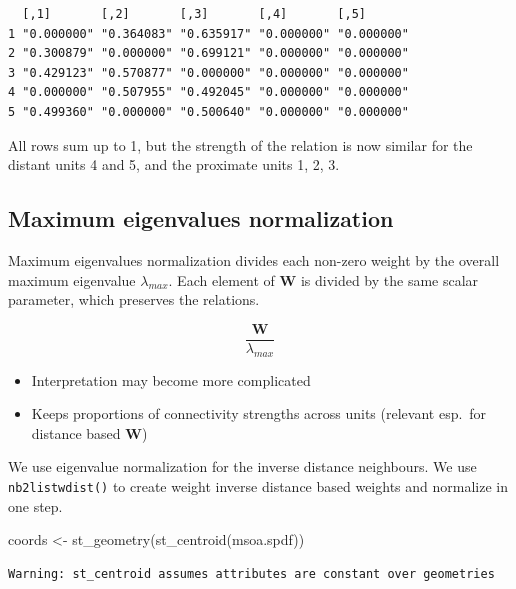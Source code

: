 \documentclass[
  letterpaper,
]{scrbook}
\newenvironment{Shaded}{\begin{snugshade}}{\end{snugshade}}
\newcommand{\FunctionTok}[1]{\textcolor[rgb]{0.28,0.35,0.67}{#1}}
\newcommand{\NormalTok}[1]{\textcolor[rgb]{0.00,0.23,0.31}{#1}}
\newcommand{\OtherTok}[1]{\textcolor[rgb]{0.00,0.23,0.31}{#1}}
\begin{document}
\begin{verbatim}
  [,1]       [,2]       [,3]       [,4]       [,5]      
1 "0.000000" "0.364083" "0.635917" "0.000000" "0.000000"
2 "0.300879" "0.000000" "0.699121" "0.000000" "0.000000"
3 "0.429123" "0.570877" "0.000000" "0.000000" "0.000000"
4 "0.000000" "0.507955" "0.492045" "0.000000" "0.000000"
5 "0.499360" "0.000000" "0.500640" "0.000000" "0.000000"
\end{verbatim}

All rows sum up to 1, but the strength of the relation is now similar
for the distant units 4 and 5, and the proximate units 1, 2, 3.

\hypertarget{maximum-eigenvalues-normalization}{%
\subsection{Maximum eigenvalues
normalization}\label{maximum-eigenvalues-normalization}}

Maximum eigenvalues normalization divides each non-zero weight by the
overall maximum eigenvalue \(\lambda_{max}\). Each element of
\(\boldsymbol{\mathbf{W}}\) is divided by the same scalar parameter,
which preserves the relations.

\[
\frac{\boldsymbol{\mathbf{W}}}{\lambda_{max}}
\]

\begin{itemize}
\item
  Interpretation may become more complicated
\item
  Keeps proportions of connectivity strengths across units (relevant
  esp.~for distance based \(\boldsymbol{\mathbf{W}}\))
\end{itemize}

We use eigenvalue normalization for the inverse distance neighbours. We
use \texttt{nb2listwdist()} to create weight inverse distance based
weights and normalize in one step.

\begin{Shaded}
\begin{Highlighting}[]
\NormalTok{coords }\OtherTok{\textless{}{-}} \FunctionTok{st\_geometry}\NormalTok{(}\FunctionTok{st\_centroid}\NormalTok{(msoa.spdf))}
\end{Highlighting}
\end{Shaded}

\begin{verbatim}
Warning: st_centroid assumes attributes are constant over geometries
\end{verbatim}
\end{document}

